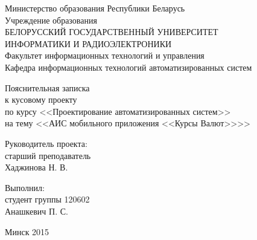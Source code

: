\begin{titlepage}
\thispagestyle{empty}
\setlength{\parindent}{0mm} %

\begin{center}
  Министерство образования Республики Беларусь \\
  \smallskip
  Учреждение образования \\
  БЕЛОРУССКИЙ ГОСУДАРСТВЕННЫЙ УНИВЕРСИТЕТ \\
  ИНФОРМАТИКИ И РАДИОЭЛЕКТРОНИКИ \\
  \smallskip
  Факультет информационных технологий и управления \\
  \smallskip
  Кафедра информационных технологий автоматизированных систем
\end{center}

\vspace{50mm}

\begin{center}
  Пояснительная записка \\
  к кусовому проекту \\
  по курсу <<Проектирование автоматизированных систем>> \\
  на тему
  <<АИС мобильного приложения <<Курсы Валют>>>> \\
\end{center}

\vspace{20mm}

\begin{minipage}{.45\linewidth}
    Руководитель проекта: \\
    старший преподаватель \\
    Хаджинова Н. В.
\end{minipage}
\hfill
\begin{minipage}{.45\linewidth}
  \begin{flushright}
    Выполнил: \\
    студент группы 120602 \\
    Анашкевич П. С.
  \end{flushright}
\end{minipage}

\vspace{70mm}
\begin{center}
  Минск 2015
\end{center}

\setlength{\parindent}{5ex} %
\end{titlepage}